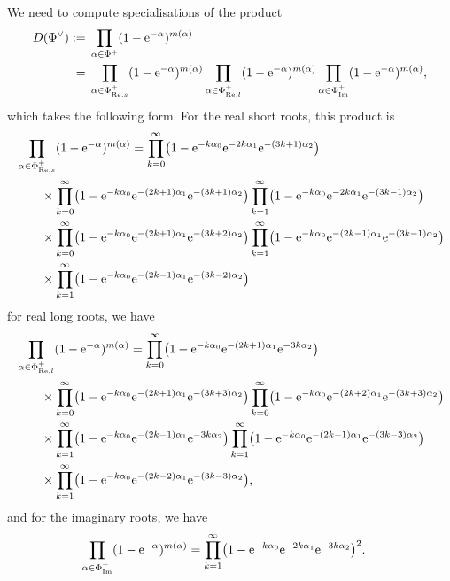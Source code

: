 \documentclass[pdftex]{sigma}
\numberwithin{equation}{section}
\theoremstyle{definition}
\begin{document}
We need to compute specialisations of the product
\begin{align*}
D(\Phi^\vee):={}&\prod_{\alpha \in \Phi^+} (1 - {\rm e}^{-\alpha})^{m(\alpha)} \\
={}&
\prod_{\alpha \in \Phi_{\mathrm{Re},s}^+} (1 - {\rm e}^{-\alpha})^{m(\alpha)}
\prod_{\alpha \in \Phi_{\mathrm{Re},l}^+} (1 - {\rm e}^{-\alpha})^{m(\alpha)}
\prod_{\alpha \in \Phi_{\mathrm{Im}}^+} (1 - {\rm e}^{-\alpha})^{m(\alpha)},
\end{align*}
which takes the following form. For the real short roots, this product is
\begin{align*}
&\prod_{\alpha \in \Phi_{\mathrm{Re},s}^+}(1 - {\rm e}^{-\alpha})^{m(\alpha)}
=\prod_{k=0}^{\infty} \bigl(1 - {\rm e}^{-k\alpha_0} {\rm e}^{-2k\alpha_1} {\rm e}^{-(3k+1)\alpha_2}\bigr)
\\
&\qquad{} \times \prod_{k=0}^{\infty} \bigl(1 - {\rm e}^{-k\alpha_0} {\rm e}^{-(2k+1)\alpha_1} {\rm e}^{-(3k+1)\alpha_2}\bigr)
\prod_{k=1}^{\infty} \bigl(1 - {\rm e}^{-k\alpha_0} {\rm e}^{-2k\alpha_1} {\rm e}^{-(3k-1)\alpha_2}\bigr) \\
&\qquad{} \times \prod_{k=0}^{\infty} \bigl(1 - {\rm e}^{-k\alpha_0} {\rm e}^{-(2k+1)\alpha_1} {\rm e}^{-(3k+2)\alpha_2}\bigr)\prod_{k=1}^{\infty} \bigl(1 - {\rm e}^{-k\alpha_0} {\rm e}^{-(2k-1)\alpha_1} {\rm e}^{-(3k-1)\alpha_2}\bigr)\\
&\qquad{}\times \prod_{k=1}^{\infty} \bigl(1 - {\rm e}^{-k\alpha_0} {\rm e}^{-(2k-1)\alpha_1} {\rm e}^{-(3k-2)\alpha_2}\bigr)
\end{align*}
for real long roots, we have
\begin{align*}
&\prod_{\alpha \in \Phi_{\mathrm{Re},l}^+} (1 - {\rm e}^{-\alpha})^{m(\alpha)}
=\prod_{k=0}^{\infty} \bigl(1 - {\rm e}^{-k\alpha_0} {\rm e}^{-(2k+1)\alpha_1} {\rm e}^{-3k\alpha_2}\bigr) \\
&\qquad \times \prod_{k=0}^{\infty} \bigl(1 - {\rm e}^{-k\alpha_0} {\rm e}^{-(2k+1)\alpha_1} {\rm e}^{-(3k+3)\alpha_2}\bigr)\prod_{k=0}^{\infty} \bigl(1 - {\rm e}^{-k\alpha_0} {\rm e}^{-(2k+2)\alpha_1} {\rm e}^{-(3k+3)\alpha_2}\bigr)\\
&\qquad{} \times \prod_{k=1}^{\infty} \bigl(1 - {\rm e}^{-k\alpha_0} {\rm e}^{-(2k-1)\alpha_1} {\rm e}^{-3k\alpha_2}\bigr)\prod_{k=1}^{\infty} \bigl(1 - {\rm e}^{-k\alpha_0} {\rm e}^{-(2k-1)\alpha_1} {\rm e}^{-(3k-3)\alpha_2}\bigr) \\
&\qquad{} \times \prod_{k=1}^{\infty} \bigl(1 - {\rm e}^{-k\alpha_0} {\rm e}^{-(2k-2)\alpha_1} {\rm e}^{-(3k-3)\alpha_2}\bigr),
\end{align*}
and for the imaginary roots, we have
\begin{align*}
\prod_{\alpha \in \Phi_{\mathrm{Im}}^+} (1 - {\rm e}^{-\alpha} )^{m(\alpha)}
&=
\prod_{k=1}^{\infty} \bigl(1 - {\rm e}^{-k\alpha_0} {\rm e}^{-2k\alpha_1} {\rm e}^{-3k\alpha_2}\bigr)^2.
\end{align*}
\end{document}
